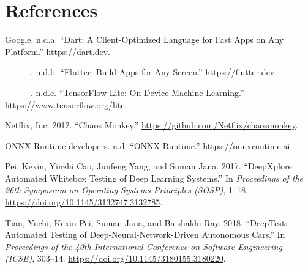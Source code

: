 \documentclass[
  11pt,
]{article}
\newlength{\cslhangindent}
\newlength{\cslentryspacingunit} %
\newenvironment{CSLReferences}[2] %
 {%
  \setlength{\parindent}{0pt}
  \ifodd #1
  \let\oldpar\par
  \def\par{\hangindent=\cslhangindent\oldpar}
  \fi
  \setlength{\parskip}{#2\cslentryspacingunit}
 }%
 {}
\begin{document}
\hypertarget{references}{%
\section*{References}\label{references}}

\hypertarget{refs}{}
\begin{CSLReferences}{1}{0}
\leavevmode{}%
Google. n.d.a. {``Dart: A Client-Optimized Language for Fast Apps on Any
Platform.''} \url{https://dart.dev}.

\leavevmode{}%
---------. n.d.b. {``Flutter: Build Apps for Any Screen.''}
\url{https://flutter.dev}.

\leavevmode{}%
---------. n.d.c. {``TensorFlow Lite: On-Device Machine Learning.''}
\url{https://www.tensorflow.org/lite}.

\leavevmode{}%
Netflix, Inc. 2012. {``Chaos Monkey.''}
\url{https://github.com/Netflix/chaosmonkey}.

\leavevmode{}%
ONNX Runtime developers. n.d. {``ONNX Runtime.''}
\url{https://onnxruntime.ai}.

\leavevmode{}%
Pei, Kexin, Yinzhi Cao, Junfeng Yang, and Suman Jana. 2017.
{``DeepXplore: Automated Whitebox Testing of Deep Learning Systems.''}
In \emph{Proceedings of the 26th Symposium on Operating Systems
Principles (SOSP)}, 1--18.
\url{https://doi.org/10.1145/3132747.3132785}.

\leavevmode{}%
Tian, Yuchi, Kexin Pei, Suman Jana, and Baishakhi Ray. 2018.
{``DeepTest: Automated Testing of Deep-Neural-Network-Driven Autonomous
Cars.''} In \emph{Proceedings of the 40th International Conference on
Software Engineering (ICSE)}, 303--14.
\url{https://doi.org/10.1145/3180155.3180220}.

\end{CSLReferences}
\end{document}
